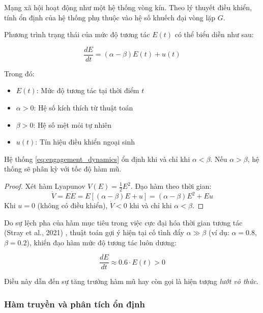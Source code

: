 Mạng xã hội hoạt động như một hệ thống vòng kín. Theo lý thuyết điều khiển, tính ổn định của hệ thống phụ thuộc vào hệ số khuếch đại vòng lặp $G$.

Phương trình trạng thái của mức độ tương tác $E(t)$ có thể biểu diễn như sau:

\begin{equation}
    \frac{dE}{dt} = (\alpha - \beta) E(t) + u(t)
    \label{eq:engagement_dynamics}
\end{equation}

Trong đó:
\begin{itemize}
    \item $E(t)$: Mức độ tương tác tại thời điểm $t$
    \item $\alpha > 0$: Hệ số kích thích từ thuật toán
    \item $\beta > 0$: Hệ số mệt mỏi tự nhiên
    \item $u(t)$: Tín hiệu điều khiển ngoại sinh
\end{itemize}

\begin{theorem}
Hệ thống \eqref{eq:engagement_dynamics} ổn định khi và chỉ khi $\alpha < \beta$. Nếu $\alpha > \beta$, hệ thống sẽ phân kỳ với tốc độ hàm mũ.
\end{theorem}

\begin{proof}
Xét hàm Lyapunov $V(E) = \frac{1}{2}E^2$. Đạo hàm theo thời gian:
\begin{equation}
    \dot{V} = E\dot{E} = E[(\alpha - \beta)E + u] = (\alpha - \beta)E^2 + Eu
\end{equation}
Khi $u = 0$ (không có điều khiển), $\dot{V} < 0$ khi và chỉ khi $\alpha < \beta$.
\end{proof}

Do sự lệch pha của hàm mục tiêu trong việc cực đại hóa thời gian tương tác (Stray et al., 2021) \cite{stray2021}, thuật toán gợi ý hiện tại cố tình đẩy $\alpha \gg \beta$ (ví dụ: $\alpha = 0.8$, $\beta = 0.2$), khiến đạo hàm mức độ tương tác luôn dương:

\begin{equation}
    \frac{dE}{dt} \approx 0.6 \cdot E(t) > 0
\end{equation}

Điều này dẫn đến sự tăng trưởng hàm mũ hay còn gọi là hiện tượng \textit{lướt vô thức}.

\subsubsection{Hàm truyền và phân tích ổn định}

